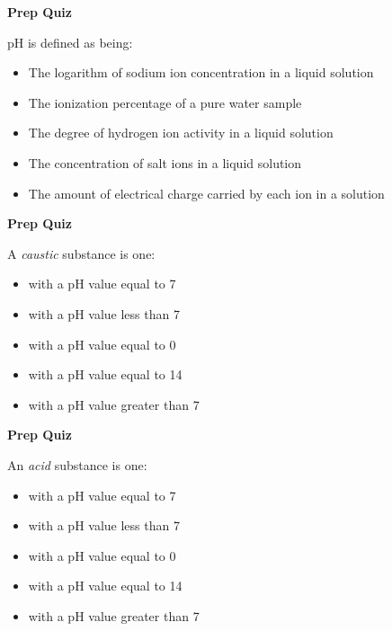\vfil \eject

\noindent
{\bf Prep Quiz}

pH is defined as being:

\begin{itemize}
\item{} The logarithm of sodium ion concentration in a liquid solution
\vskip 5pt
\item{} The ionization percentage of a pure water sample
\vskip 5pt
\item{} The degree of hydrogen ion activity in a liquid solution
\vskip 5pt
\item{} The concentration of salt ions in a liquid solution
\vskip 5pt
\item{} The amount of electrical charge carried by each ion in a solution
\end{itemize}


\vfil \eject

\noindent
{\bf Prep Quiz}

A {\it caustic} substance is one:

\begin{itemize}
\item{} with a pH value equal to 7 
\vskip 5pt
\item{} with a pH value less than 7 
\vskip 5pt
\item{} with a pH value equal to 0 
\vskip 5pt
\item{} with a pH value equal to 14 
\vskip 5pt
\item{} with a pH value greater than 7
\end{itemize}


\vfil \eject

\noindent
{\bf Prep Quiz}

An {\it acid} substance is one:

\begin{itemize}
\item{} with a pH value equal to 7 
\vskip 5pt
\item{} with a pH value less than 7 
\vskip 5pt
\item{} with a pH value equal to 0 
\vskip 5pt
\item{} with a pH value equal to 14 
\vskip 5pt
\item{} with a pH value greater than 7
\end{itemize}





